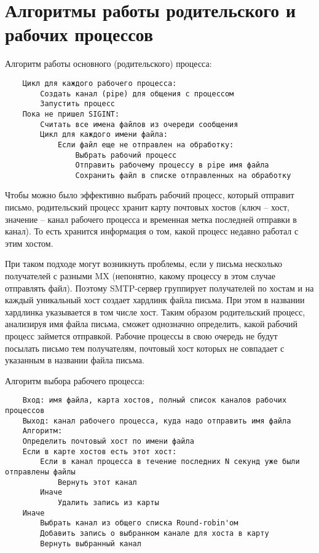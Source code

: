 \documentclass[a4paper,12pt]{report}
\begin{document}
\section{Алгоритмы работы родительского и рабочих процессов}

Алгоритм работы основного (родительского) процесса:

\begin{verbatim}
    Цикл для каждого рабочего процесса:
        Создать канал (pipe) для общения с процессом
        Запустить процесс
    Пока не пришел SIGINT:
        Считать все имена файлов из очереди сообщения
        Цикл для каждого имени файла:
            Если файл еще не отправлен на обработку:
                Выбрать рабочий процесс
                Отправить рабочему процессу в pipe имя файла
                Сохранить файл в списке отправленных на обработку
\end{verbatim}

Чтобы можно было эффективно выбрать рабочий процесс, который отправит письмо, родительский процесс хранит карту почтовых хостов (ключ -- хост, значение -- канал рабочего процесса и временная метка последней отправки в канал). То есть хранится информация о том, какой процесс недавно работал с этим хостом.

При таком подходе могут возникнуть проблемы, если у письма несколько получателей с разными MX (непонятно, какому процессу в этом случае отправлять файл). Поэтому SMTP-сервер группирует получателей по хостам и на каждый уникальный хост создает хардлинк файла письма. При этом в названии хардлинка указывается в том числе хост. Таким образом родительский процесс, анализируя имя файла письма, сможет однозначно определить, какой рабочий процесс займется отправкой. Рабочие процессы в свою очередь не будут посылать письмо тем получателям, почтовый хост которых не совпадает с указанным в названии файла письма.

Алгоритм выбора рабочего процесса:
\begin{verbatim}
    Вход: имя файла, карта хостов, полный список каналов рабочих процессов
    Выход: канал рабочего процесса, куда надо отправить имя файла
    Алгоритм:
    Определить почтовый хост по имени файла
    Если в карте хостов есть этот хост:
        Если в канал процесса в течение последних N секунд уже были отправлены файлы
            Вернуть этот канал
        Иначе
            Удалить запись из карты
    Иначе
        Выбрать канал из общего списка Round-robin'ом
        Добавить запись о выбранном канале для хоста в карту
        Вернуть выбранный канал
\end{verbatim}
\end{document}
